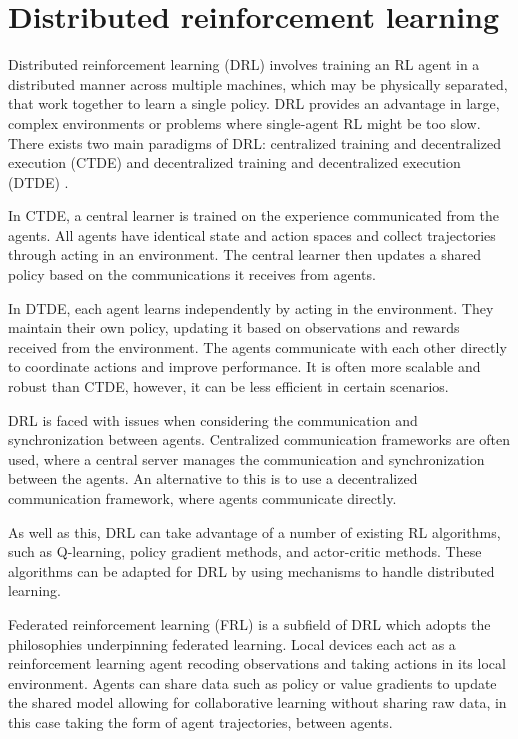 \section{Distributed reinforcement learning}

Distributed reinforcement learning (DRL) involves training an RL agent in a distributed manner across multiple machines, which may be physically separated, that work together to learn a single policy. DRL provides an advantage in large, complex environments or problems where single-agent RL might be too slow.
There exists two main paradigms of DRL: centralized training and decentralized execution (CTDE) and decentralized training and decentralized execution (DTDE) \cite{DRLSurvey}.

In CTDE, a central learner is trained on the experience communicated from the agents. All agents have identical state and action spaces and collect trajectories through acting in an environment. The central learner then updates a shared policy based on the communications it receives from agents. 

In DTDE, each agent learns independently by acting in the environment. They maintain their own policy, updating it based on observations and rewards received from the environment. The agents communicate with each other directly to coordinate actions and improve performance. It is often more scalable and robust than CTDE, however, it can be less efficient in certain scenarios.

DRL is faced with issues when considering the communication and synchronization between agents. Centralized communication frameworks are often used, where a central server manages the communication and synchronization between the agents. An alternative to this is to use a decentralized communication framework, where agents communicate directly.

As well as this, DRL can take advantage of a number of existing RL algorithms, such as Q-learning, policy gradient methods, and actor-critic methods. These algorithms can be adapted for DRL by using mechanisms to handle distributed learning.

Federated reinforcement learning (FRL) \cite{FRL} is a subfield of DRL which adopts the philosophies underpinning federated learning. Local devices each act as a reinforcement learning agent recoding observations and taking actions in its local environment. Agents can share data such as policy or value gradients to update the shared model allowing for collaborative learning without sharing raw data, in this case taking the form of agent trajectories, between agents.

